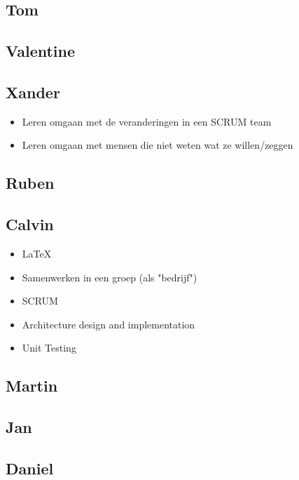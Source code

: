 \documentclass{article}
\begin{document}
\subsection*{Tom}
\subsection*{Valentine}

\subsection*{Xander}
\begin{itemize}
	\item Leren omgaan met de veranderingen in een SCRUM team
	\item Leren omgaan met mensen die niet weten wat ze willen/zeggen
\end{itemize}

\subsection*{Ruben}
\subsection*{Calvin}
\begin{itemize}
 	\item \LaTeX
	\item Samenwerken in een groep (als "bedrijf")
	\item SCRUM
	\item Architecture design and  implementation
	\item Unit Testing
\end{itemize}
\subsection*{Martin}
\subsection*{Jan}
\subsection*{Daniel} 
\end{document}
